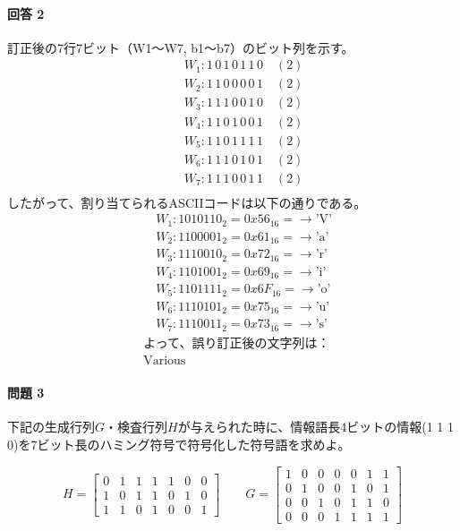 \documentclass[dvipdfmx,titlepage,a4j]{jsarticle}
\begin{document}
\paragraph{ 回答 2\\}
訂正後の7行7ビット（W1～W7, b1～b7）のビット列を示す。
\[
\begin{aligned}
&\quad W_1: 1\,0\,1\,0\,1\,1\,0 \quad(2)\\
&\quad W_2: 1\,1\,0\,0\,0\,0\,1 \quad(2)\\
&\quad W_3: 1\,1\,1\,0\,0\,1\,0 \quad(2)\\
&\quad W_4: 1\,1\,0\,1\,0\,0\,1 \quad(2)\\
&\quad W_5: 1\,1\,0\,1\,1\,1\,1 \quad(2)\\
&\quad W_6: 1\,1\,1\,0\,1\,0\,1 \quad(2)\\
&\quad W_7: 1\,1\,1\,0\,0\,1\,1 \quad(2)\\[6pt]
\end{aligned}
\]
したがって、割り当てられるASCIIコードは以下の通りである。
\[
\begin{aligned}
&\quad W_1: 1010110_2 = 0x56_{16} = \rightarrow\text{'V'}\\
&\quad W_2: 1100001_2 = 0x61_{16} = \rightarrow\text{'a'}\\
&\quad W_3: 1110010_2 = 0x72_{16} = \rightarrow\text{'r'}\\
&\quad W_4: 1101001_2 = 0x69_{16} = \rightarrow\text{'i'}\\
&\quad W_5: 1101111_2 = 0x6F_{16} = \rightarrow\text{'o'}\\
&\quad W_6: 1110101_2 = 0x75_{16} = \rightarrow\text{'u'}\\
&\quad W_7: 1110011_2 = 0x73_{16} = \rightarrow\text{'s'}\\[6pt]
&\text{よって、誤り訂正後の文字列は：}\\
&\boxed{\text{Various}}
\end{aligned}
\]

\paragraph{ 問題 3\\}
下記の生成行列$G$・検査行列$H$が与えられた時に、情報語長4ビットの情報(1 1 1 0)を7ビット長のハミング符号で符号化した符号語を求めよ。

\[
H = \begin{bmatrix}
0 & 1 & 1 & 1 & 1 & 0 & 0 \\
1 & 0 & 1 & 1 & 0 & 1 & 0 \\
1 & 1 & 0 & 1 & 0 & 0 & 1
\end{bmatrix}
\qquad
G = \begin{bmatrix}
1 & 0 & 0 & 0 & 0 & 1 & 1 \\
0 & 1 & 0 & 0 & 1 & 0 & 1 \\
0 & 0 & 1 & 0 & 1 & 1 & 0 \\
0 & 0 & 0 & 1 & 1 & 1 & 1
\end{bmatrix}
\]
\end{document}
